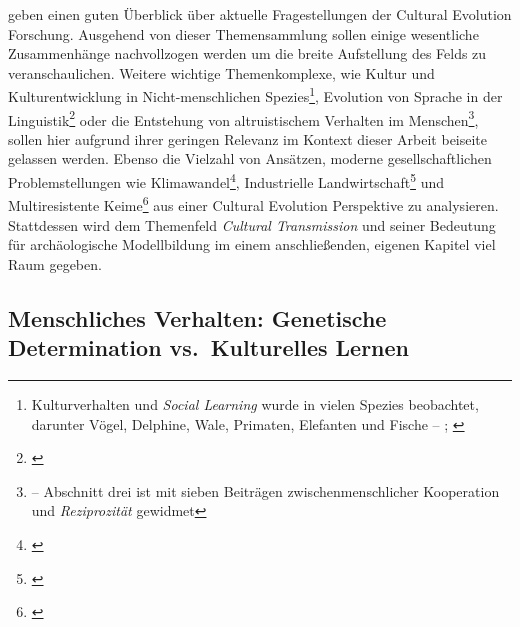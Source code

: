 \documentclass[openany,twoside,twocolumn]{book}
\let\rmarkdownfootnote\footnote%
\def\footnote{\protect\rmarkdownfootnote}
\begin{document}
\textcite{creanza_cultural_2017} geben einen guten Überblick über
aktuelle Fragestellungen der Cultural Evolution Forschung. Ausgehend von
dieser Themensammlung sollen einige wesentliche Zusammenhänge
nachvollzogen werden um die breite Aufstellung des Felds zu
veranschaulichen. Weitere wichtige Themenkomplexe, wie Kultur und
Kulturentwicklung in Nicht-menschlichen Spezies\footnote{Kulturverhalten
  und \emph{Social Learning} wurde in vielen Spezies beobachtet,
  darunter Vögel, Delphine, Wale, Primaten, Elefanten und Fische --
  \textcite{eerkens_cultural_2007}; \textcite{laland_question_2009}},
Evolution von Sprache in der Linguistik\footnote{\textcite{nowak_evolution_1999}}
oder die Entstehung von altruistischem Verhalten im Menschen\footnote{\textcite{boyd_origin_2005}
  -- Abschnitt drei ist mit sieben Beiträgen zwischenmenschlicher
  Kooperation und \emph{Reziprozität} gewidmet}, sollen hier aufgrund
ihrer geringen Relevanz im Kontext dieser Arbeit beiseite gelassen
werden. Ebenso die Vielzahl von Ansätzen, moderne gesellschaftlichen
Problemstellungen wie Klimawandel\footnote{\textcite{seneviratne_allowable_2016}},
Industrielle Landwirtschaft\footnote{\textcite{garibaldi_farming_2017}}
und Multiresistente Keime\footnote{\textcite{boni_evolution_2005}} aus
einer Cultural Evolution Perspektive zu analysieren. Stattdessen wird
dem Themenfeld \emph{Cultural Transmission} und seiner Bedeutung für
archäologische Modellbildung im einem anschließenden, eigenen Kapitel
viel Raum gegeben.

\hypertarget{menschliches-verhalten-genetische-determination-vs.kulturelles-lernen}{%
\subsection{Menschliches Verhalten: Genetische Determination
vs.~Kulturelles
Lernen}\label{menschliches-verhalten-genetische-determination-vs.kulturelles-lernen}}
\end{document}
